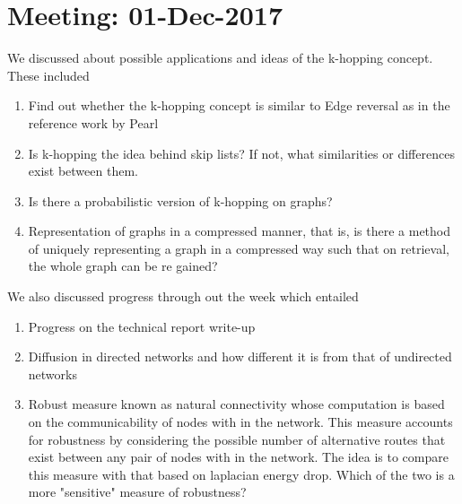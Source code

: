 \documentclass[10pt,a4paper]{article}
\begin{document}
\section*{Meeting: 01-Dec-2017}
We discussed about possible applications and ideas of the k-hopping concept. These included
\begin{enumerate}
\item Find out whether the k-hopping concept is similar to Edge reversal as in the reference work by Pearl
\item Is k-hopping the idea behind skip lists? If not, what similarities or differences exist between them.
\item Is there a probabilistic version of k-hopping on graphs?
\item Representation of graphs in a compressed manner, that is, is there a method of uniquely representing a graph in a compressed way such that on retrieval, the whole graph can be re gained?
\end{enumerate}
We also discussed progress through out the week which entailed
\begin{enumerate}
	\item Progress on the technical report write-up
	\item Diffusion in directed networks and how different it is from that of undirected networks 
	\item Robust measure known as natural connectivity whose computation is based on the communicability of nodes with in the network. This measure accounts for robustness by considering the possible number of alternative routes that exist between any pair of nodes with in the network. The idea is to compare this measure with that based on laplacian energy drop. Which of the two is a more "sensitive" measure of robustness?
\end{enumerate}
\end{document}
